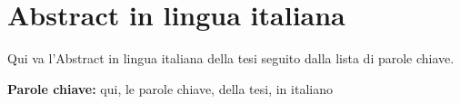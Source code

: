 \section*{Abstract in lingua italiana}
Qui va l'Abstract in lingua italiana della tesi seguito dalla lista di
parole chiave.  \vspace{15pt}

\begin{tcolorbox}[arc=0pt, boxrule=0pt, colback=bluePoli!60, width=\textwidth, colupper=white]
  \textbf{Parole chiave:} qui, le parole chiave, della tesi, in
  italiano
\end{tcolorbox}
